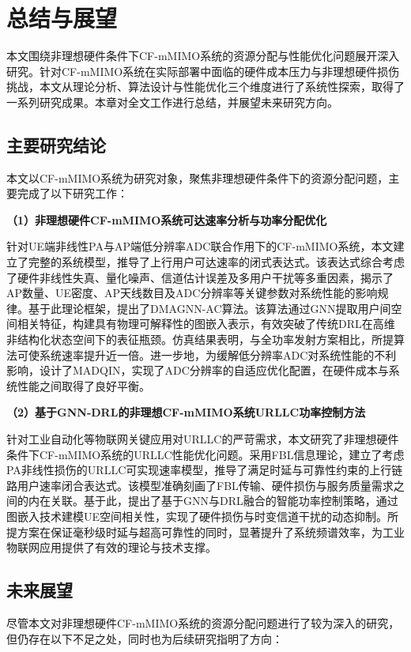 \chapter{总结与展望}

本文围绕非理想硬件条件下CF-mMIMO系统的资源分配与性能优化问题展开深入研究。针对CF-mMIMO系统在实际部署中面临的硬件成本压力与非理想硬件损伤挑战，本文从理论分析、算法设计与性能优化三个维度进行了系统性探索，取得了一系列研究成果。本章对全文工作进行总结，并展望未来研究方向。


\section{主要研究结论}

本文以CF-mMIMO系统为研究对象，聚焦非理想硬件条件下的资源分配问题，主要完成了以下研究工作：

\textbf{（1）非理想硬件CF-mMIMO系统可达速率分析与功率分配优化}

针对UE端非线性PA与AP端低分辨率ADC联合作用下的CF-mMIMO系统，本文建立了完整的系统模型，推导了上行用户可达速率的闭式表达式。该表达式综合考虑了硬件非线性失真、量化噪声、信道估计误差及多用户干扰等多重因素，揭示了AP数量、UE密度、AP天线数目及ADC分辨率等关键参数对系统性能的影响规律。基于此理论框架，提出了DMAGNN-AC算法。该算法通过GNN提取用户间空间相关特征，构建具有物理可解释性的图嵌入表示，有效突破了传统DRL在高维非结构化状态空间下的表征瓶颈。仿真结果表明，与全功率发射方案相比，所提算法可使系统速率提升近一倍。进一步地，为缓解低分辨率ADC对系统性能的不利影响，设计了MADQIN，实现了ADC分辨率的自适应优化配置，在硬件成本与系统性能之间取得了良好平衡。

\textbf{（2）基于GNN-DRL的非理想CF-mMIMO系统URLLC功率控制方法}

针对工业自动化等物联网关键应用对URLLC的严苛需求，本文研究了非理想硬件条件下CF-mMIMO系统的URLLC性能优化问题。采用FBL信息理论，建立了考虑PA非线性损伤的URLLC可实现速率模型，推导了满足时延与可靠性约束的上行链路用户速率闭合表达式。该模型准确刻画了FBL传输、硬件损伤与服务质量需求之间的内在关联。基于此，提出了基于GNN与DRL融合的智能功率控制策略，通过图嵌入技术建模UE空间相关性，实现了硬件损伤与时变信道干扰的动态抑制。所提方案在保证毫秒级时延与超高可靠性的同时，显著提升了系统频谱效率，为工业物联网应用提供了有效的理论与技术支撑。


\section{未来展望}

尽管本文对非理想硬件CF-mMIMO系统的资源分配问题进行了较为深入的研究，但仍存在以下不足之处，同时也为后续研究指明了方向：

